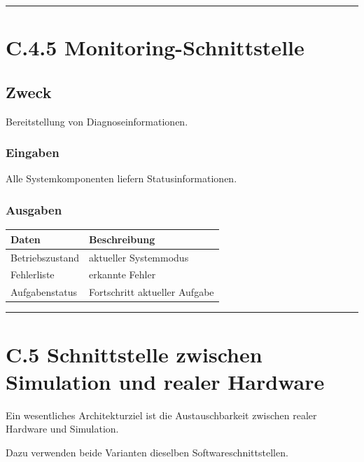 \documentclass[
]{article}
\begin{document}
\begin{center}\rule{0.5\linewidth}{0.5pt}\end{center}

\section{C.4.5
Monitoring-Schnittstelle}\label{c.4.5-monitoring-schnittstelle}

\subsection{Zweck}\label{zweck-9}

Bereitstellung von Diagnoseinformationen.

\subsubsection{Eingaben}\label{eingaben-4}

Alle Systemkomponenten liefern Statusinformationen.

\subsubsection{Ausgaben}\label{ausgaben-4}

\begin{longtable}[]{@{}ll@{}}
\toprule\noalign{}
Daten & Beschreibung \\
\midrule\noalign{}
\endhead
\bottomrule\noalign{}
\endlastfoot
Betriebszustand & aktueller Systemmodus \\
Fehlerliste & erkannte Fehler \\
Aufgabenstatus & Fortschritt aktueller Aufgabe \\
\end{longtable}

\begin{center}\rule{0.5\linewidth}{0.5pt}\end{center}

\section{C.5 Schnittstelle zwischen Simulation und realer
Hardware}\label{c.5-schnittstelle-zwischen-simulation-und-realer-hardware}

Ein wesentliches Architekturziel ist die Austauschbarkeit zwischen
realer Hardware und Simulation.

Dazu verwenden beide Varianten dieselben Softwareschnittstellen.
\end{document}
